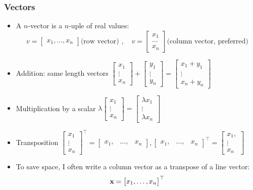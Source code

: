 \documentclass[8pt,dvipsnames]{beamer}
\begin{document}
\begin{frame}
  \frametitle{Vectors}
  \begin{itemize}
  \item A $n$-vector is a $n$-uple of real values:
    $$
    v =
    \begin{bmatrix}
      x_1, \dots,  x_n
    \end{bmatrix}
    \text{(row vector) },\quad
    v =
    \begin{bmatrix}
      x_1\\\dots\\x_n
    \end{bmatrix}
    \text{(column vector, preferred)}
    $$
  \item Addition: same length vectors
    $
    \begin{bmatrix}
      x_1\\\vdots\\x_n
    \end{bmatrix}
    +
    \begin{bmatrix}
      y_1\\\vdots\\y_n
    \end{bmatrix}
    =
    \begin{bmatrix}
      x_1+y_1\\\vdots\\x_n+y_n
    \end{bmatrix}
    $
  \item Multiplication by a scalar
    $
    \lambda\begin{bmatrix}
      x_1\\\vdots\\x_n
    \end{bmatrix}
    = 
    \begin{bmatrix}
      \lambda x_1\\\vdots\\\lambda x_n
    \end{bmatrix}
    $
  \item Transposition  
    $
    \begin{bmatrix}
      x_1\\\vdots\\x_n
    \end{bmatrix}^\top =
    \begin{bmatrix}
      x_1,&\dots,&x_n
    \end{bmatrix}
    ,
    \begin{bmatrix}
      x_1,&\dots,&x_n
    \end{bmatrix}^\top =
    \begin{bmatrix}
      x_1,\\\vdots\\x_n
    \end{bmatrix}
    $
  \item To save space, I often write a column vector as a transpose of a line vector:
    $$
    {\bf x} =   \begin{bmatrix}
      x_1,\dots, x_n
    \end{bmatrix}^\top
    $$
  \end{itemize}
\end{frame}
\end{document}
